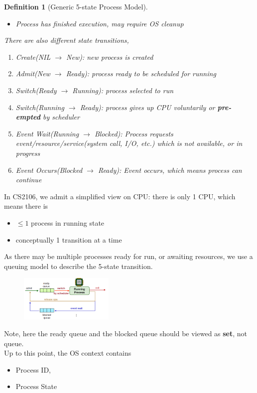 \documentclass[12pt]{article}
\newtheorem{definition}{Definition}[section]
\theoremstyle{definition}
\begin{document}
\begin{definition}[Generic 5-state Process Model]
\begin{enumerate}
\begin{itemize}
    \item Process has finished execution, may require OS cleanup
  \end{itemize}
\end{enumerate}
There are also different state transitions,
\begin{enumerate}
  \item Create(NIL $\to$ New): new process is created
  \item Admit(New $\to$ Ready): process ready to be scheduled for running
  \item Switch(Ready $\to$ Running): process selected to run
  \item Switch(Running $\to$ Ready): process gives up CPU voluntarily or \textbf{pre-empted} by scheduler
  \item Event Wait(Running $\to$ Blocked): Process requests event/resource/service(system call, I/O, etc.) which is not available, or in progress
  \item Event Occurs(Blocked $\to$ Ready): Event occurs, which means process can continue
\end{enumerate}
\end{definition} 
In CS2106, we admit a simplified view on CPU: there is only 1 CPU, which means there is
\begin{itemize}
  \item $\leq 1$ process in running state
  \item conceptually 1 transition at a time
\end{itemize}
As there may be multiple processes ready for run, or awaiting resources, we use a queuing model to describe the 5-state transition.
\begin{figure}[h]
\centering
\includegraphics[width=0.4\textwidth]{2_4.png}
\end{figure}
Note, here the ready queue and the blocked queue should be viewed as \textbf{set}, not queue.\\

Up to this point, the OS context contains
\begin{itemize}
  \item Process ID,
  \item Process State
\end{itemize}
\end{document}
